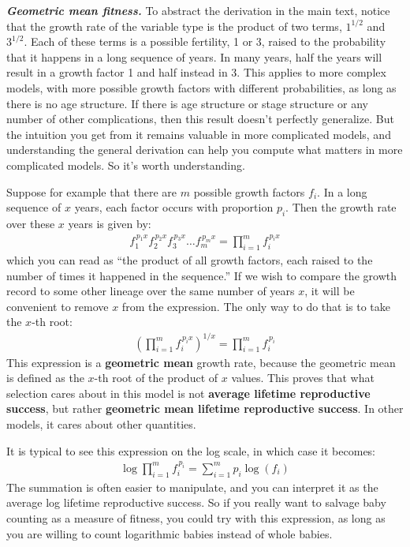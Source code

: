 \documentclass[10pt,reqno]{amsbook}
\newcommand{\bemph}[1]{{\textbf{\textcolor{bemphcol}{#1}}}}
\numberwithin{equation}{chapter}
\newenvironment{mathboxmp}[1]
{\begin{tcolorbox}[breakable, enhanced, oversize]\footnotesize\noindent\textbf{\emph{#1}}}
{\end{tcolorbox}}
\begin{document}
\begin{mathboxmp}{Geometric mean fitness.} 
To abstract the derivation in the main text, notice that the growth rate of the variable type is the product of two terms, $1^{\!1/2}$ and $3^{\!1/2}$. Each of these terms is a possible fertility, 1 or 3, raised to the probability that it happens in a long sequence of years. In many years, half the years will result in a growth factor 1 and half instead in 3. This applies to more complex models, with more possible growth factors with different probabilities, as long as there is no age structure. If there is age structure or stage structure or any number of other complications, then this result doesn't perfectly generalize. But the intuition you get from it remains valuable in more complicated models, and understanding the general derivation can help you compute what matters in more complicated models. So it's worth understanding.

Suppose for example that there are $m$ possible growth factors $f_i$. In a long sequence of $x$ years, each factor occurs with proportion $p_i$. Then the growth rate over these $x$ years is given by:
\begin{align*}
	 f_1^{\,p_1 x} f_2^{\,p_2 x} f_3^{\,p_3 x} \hdots f_m^{\,p_m x}  =  \prod_{i=1}^m f_i^{\,p_i x} 
\end{align*}
which you can read as ``the product of all growth factors, each raised to the number of times it happened in the sequence.'' If we wish to compare the growth record to some other lineage over the same number of years $x$, it will be convenient to remove $x$ from the expression. The only way to do that is to take the $x$-th root:
\begin{align*}
	 \left( \prod_{i=1}^m f_i^{\,p_i x} \right)^{\!\!1/x} = \prod_{i=1}^m f_i^{\,p_i }
\end{align*}
This expression is a \bemph{geometric mean} growth rate, because the geometric mean is defined as the $x$-th root of the product of $x$ values. This proves that what selection cares about in this model is not \bemph{average lifetime reproductive success}, but rather \bemph{geometric mean lifetime reproductive success}. In other models, it cares about other quantities.

It is typical to see this expression on the log scale, in which case it becomes:
\begin{align*}
	\log \prod_{i=1}^m f_i^{\,p_i} = \sum_{i=1}^m p_i \log(f_i)
\end{align*}
The summation is often easier to manipulate, and you can interpret it as the average log lifetime reproductive success. So if you really want to salvage baby counting as a measure of fitness, you could try with this expression, as long as you are willing to count logarithmic babies instead of whole babies.


\end{mathboxmp}
\end{document}
